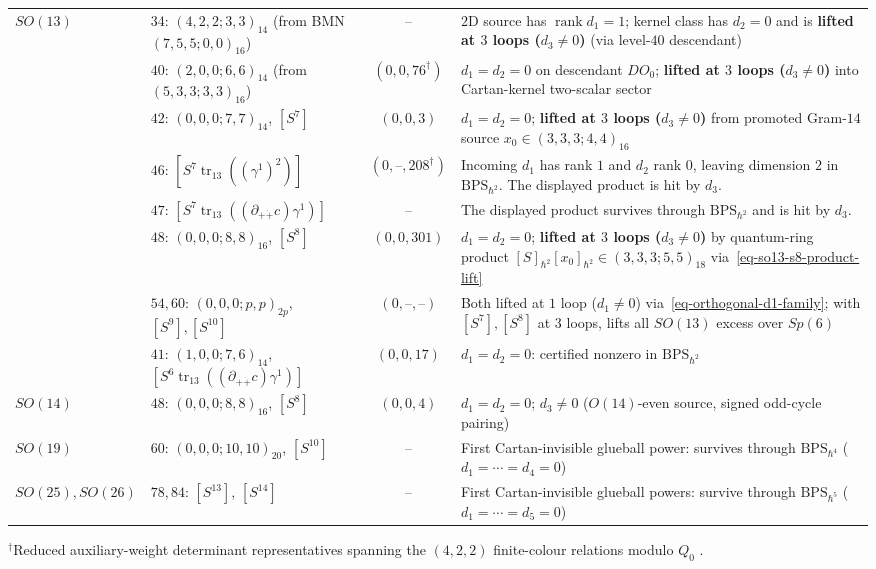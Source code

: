 \documentclass[11pt]{article}
\numberwithin{equation}{section}
\numberwithin{figure}{section}
\numberwithin{table}{section}
\begin{document}
{\begin{xltabular}{\linewidth}{|l|>{\raggedright\arraybackslash}p{4.05cm}|c|>{\raggedright\arraybackslash}X|}
\hline
$SO(13)$ & $34$: $(4,2,2;3,3)_{14}$ (from BMN $(7,5,5;0,0)_{16}$) & $\text{--}$ & $2$D source has $\operatorname{rank}d_1=1$; kernel class has $d_2=0$ and is \textbf{lifted at $3$ loops ($d_3\ne0$)} (via level-$40$ descendant)\\
 & $40$: $(2,0,0;6,6)_{14}$ (from $(5,3,3;3,3)_{16}$) & $(0,0,76^\dagger)$ & $d_1=d_2=0$ on descendant $DO_0$; \textbf{lifted at $3$ loops ($d_3\ne0$)} into Cartan-kernel two-scalar sector\\
 & $42$: $(0,0,0;7,7)_{14}$, $[S^7]$ & $(0,0,3)$ & $d_1=d_2=0$; \textbf{lifted at $3$ loops ($d_3\ne0$)} from promoted Gram-$14$ source $x_0\in(3,3,3;4,4)_{16}$\\
 & $46$: $[S^7\operatorname{tr}_{13}((\gamma^1)^2)]$ & $(0,\text{--},208^\dagger)$ & Incoming $d_1$ has rank $1$ and $d_2$ rank $0$, leaving dimension $2$ in $\mathrm{BPS}_{\hbar^2}$. The displayed product is hit by $d_3$.\\
 & $47$: $[S^7\operatorname{tr}_{13}((\partial_{+\dot+}c)\gamma^1)]$ & $\text{--}$ & The displayed product survives through $\mathrm{BPS}_{\hbar^2}$ and is hit by $d_3$.\\
 & $48$: $(0,0,0;8,8)_{16}$, $[S^8]$ & $(0,0,301)$ & $d_1=d_2=0$; \textbf{lifted at $3$ loops ($d_3\ne0$)} by quantum-ring product $[S]_{\hbar^2}[x_0]_{\hbar^2}\in(3,3,3;5,5)_{18}$ via~\eqref{eq-so13-s8-product-lift}\\
 & $54,60$: $(0,0,0;p,p)_{2p}$, $[S^9],[S^{10}]$ & $(0,\text{--},\text{--})$ & Both lifted at $1$ loop ($d_1\ne0$) via~\eqref{eq-orthogonal-d1-family}; with $[S^7],[S^8]$ at $3$ loops, lifts all $SO(13)$ excess over $Sp(6)$\\
 & $41$: $(1,0,0;7,6)_{14}$, $[S^6\operatorname{tr}_{13}((\partial_{+\dot+}c)\gamma^1)]$ & $(0,0,17)$ & $d_1=d_2=0$: certified nonzero in $\mathrm{BPS}_{\hbar^2}$\\
\hline
$SO(14)$ & $48$: $(0,0,0;8,8)_{16}$, $[S^8]$ & $(0,0,4)$ & $d_1=d_2=0$; $d_3\ne0$ \cite{Repo} ($O(14)$-even source, signed odd-cycle pairing)\\
\hline
$SO(19)$ & $60$: $(0,0,0;10,10)_{20}$, $[S^{10}]$ & $\text{--}$ & First Cartan-invisible glueball power: survives through $\mathrm{BPS}_{\hbar^4}$ ($d_1=\cdots=d_4=0$) \cite{Repo}\\
\hline
$SO(25),SO(26)$ & $78,84$: $[S^{13}]$, $[S^{14}]$ & $\text{--}$ & First Cartan-invisible glueball powers: survive through $\mathrm{BPS}_{\hbar^5}$ ($d_1=\cdots=d_5=0$) \cite{Repo}\\
\hline
\end{xltabular}}
{\footnotesize$^\dagger$Reduced auxiliary-weight determinant representatives spanning the $(4,2,2)$ finite-colour relations modulo $Q_0$ \cite{Repo}.\par}
\end{document}
